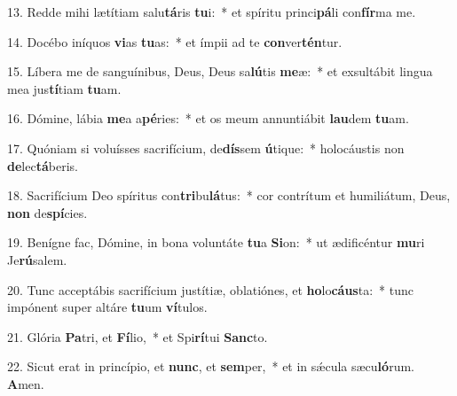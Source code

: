 13. Redde mihi lætítiam salu\textbf{tá}ris \textbf{tu}i:~* et spíritu princi\textbf{pá}li con\textbf{fír}ma me.

14. Docébo iníquos \textbf{vi}as \textbf{tu}as:~* et ímpii ad te \textbf{con}ver\textbf{tén}tur.

15. Líbera me de sanguínibus, Deus, Deus sa\textbf{lú}tis \textbf{me}æ:~* et exsultábit lingua mea jus\textbf{tí}tiam \textbf{tu}am.

16. Dómine, lábia \textbf{me}a a\textbf{pé}ries:~* et os meum annuntiábit \textbf{lau}dem \textbf{tu}am.

17. Quóniam si voluísses sacrifícium, de\textbf{dís}sem \textbf{ú}tique:~* holocáustis non \textbf{de}lec\textbf{tá}beris.

18. Sacrifícium Deo spíritus con\textbf{tri}bu\textbf{lá}tus:~* cor contrítum et humiliátum, Deus, \textbf{non} de\textbf{spí}cies.

19. Benígne fac, Dómine, in bona voluntáte \textbf{tu}a \textbf{Si}on:~* ut ædificéntur \textbf{mu}ri Je\textbf{rú}salem.

20. Tunc acceptábis sacrifícium justítiæ, oblatiónes, et \textbf{ho}lo\textbf{cáus}ta:~* tunc impónent super altáre \textbf{tu}um \textbf{ví}tulos.

21. Glória \textbf{Pa}tri, et \textbf{Fí}lio,~* et Spi\textbf{rí}tui \textbf{Sanc}to.

22. Sicut erat in princípio, et \textbf{nunc}, et \textbf{sem}per,~* et in s\'{\ae}cula sæcu\textbf{ló}rum. \textbf{A}men.
